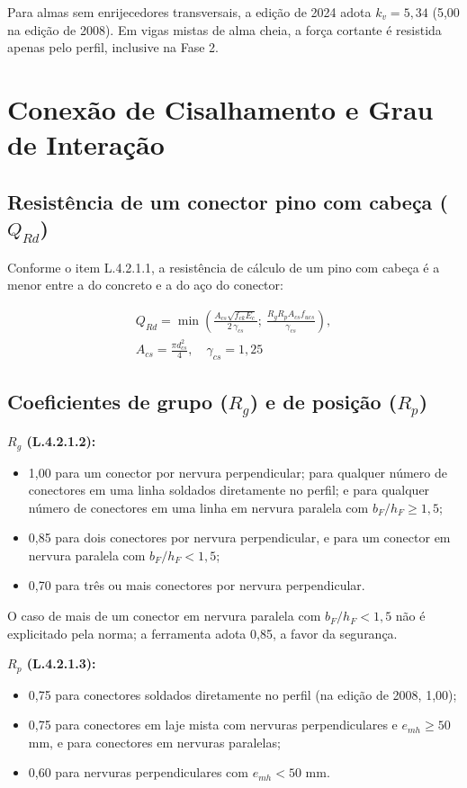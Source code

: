 Para almas sem enrijecedores transversais, a edição de 2024 adota $k_v = 5{,}34$ (5,00 na edição de 2008). Em vigas mistas de alma cheia, a força cortante é resistida apenas pelo perfil, inclusive na Fase 2.

\section{Conexão de Cisalhamento e Grau de Interação}\label{sec:2.5}

\subsection{Resistência de um conector pino com cabeça ($Q_{Rd}$)}\label{sec:2.5.1}
Conforme o item L.4.2.1.1, a resistência de cálculo de um pino com cabeça é a menor entre a do concreto e a do aço do conector:

\begin{gather*}
  Q_{Rd} = \min\left( \frac{A_{cs}\sqrt{f_{ck} E_c}}{2\,\gamma_{cs}};\ \frac{R_g R_p A_{cs} f_{ucs}}{\gamma_{cs}} \right), \\
  A_{cs} = \frac{\pi d_{cs}^2}{4}, \quad \gamma_{cs} = 1{,}25
\end{gather*}

\subsection{Coeficientes de grupo ($R_g$) e de posição ($R_p$)}\label{sec:2.5.2}
\textbf{$R_g$ (L.4.2.1.2):}
\begin{itemize}
\item 1,00 para um conector por nervura perpendicular; para qualquer número de conectores em uma linha soldados diretamente no perfil; e para qualquer número de conectores em uma linha em nervura paralela com $b_F/h_F \ge 1{,}5$;
\item 0,85 para dois conectores por nervura perpendicular, e para um conector em nervura paralela com $b_F/h_F < 1{,}5$;
\item 0,70 para três ou mais conectores por nervura perpendicular.
\end{itemize}

O caso de mais de um conector em nervura paralela com $b_F/h_F < 1{,}5$ não é explicitado pela norma; a ferramenta adota 0,85, a favor da segurança.

\textbf{$R_p$ (L.4.2.1.3):}
\begin{itemize}
\item 0,75 para conectores soldados diretamente no perfil (na edição de 2008, 1,00);
\item 0,75 para conectores em laje mista com nervuras perpendiculares e $e_{mh} \ge 50$ mm, e para conectores em nervuras paralelas;
\item 0,60 para nervuras perpendiculares com $e_{mh} < 50$ mm.
\end{itemize}

